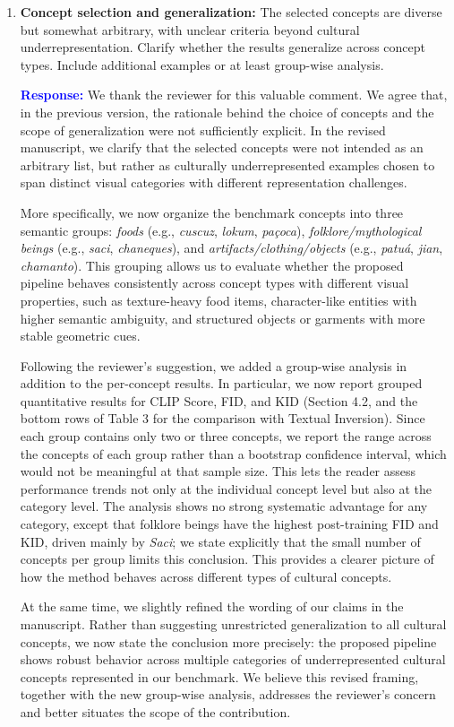\documentclass[11pt]{article}
\begin{document}
\begin{enumerate}[label=\textbf{C\arabic*.}, leftmargin=*]
\item \textbf{Concept selection and generalization:} The selected concepts are diverse but somewhat arbitrary, with unclear criteria beyond cultural underrepresentation. Clarify whether the results generalize across concept types. Include additional examples or at least group-wise analysis.

\textbf{\textcolor{blue}{Response:}} We thank the reviewer for this valuable comment. We agree that, in the previous version, the rationale behind the choice of concepts and the scope of generalization were not sufficiently explicit. In the revised manuscript, we clarify that the selected concepts were not intended as an arbitrary list, but rather as culturally underrepresented examples chosen to span distinct visual categories with different representation challenges.

More specifically, we now organize the benchmark concepts into three semantic groups: \emph{foods} (e.g., \textit{cuscuz}, \textit{lokum}, \textit{pa\c{c}oca}), \emph{folklore/mythological beings} (e.g., \textit{saci}, \textit{chaneques}), and \emph{artifacts/clothing/objects} (e.g., \textit{patu\'a}, \textit{jian}, \textit{chamanto}). This grouping allows us to evaluate whether the proposed pipeline behaves consistently across concept types with different visual properties, such as texture-heavy food items, character-like entities with higher semantic ambiguity, and structured objects or garments with more stable geometric cues.

Following the reviewer’s suggestion, we added a group-wise analysis in addition to the per-concept results. In particular, we now report grouped quantitative results for CLIP Score, FID, and KID (Section 4.2, and the bottom rows of Table 3 for the comparison with Textual Inversion). Since each group contains only two or three concepts, we report the range across the concepts of each group rather than a bootstrap confidence interval, which would not be meaningful at that sample size. This lets the reader assess performance trends not only at the individual concept level but also at the category level. The analysis shows no strong systematic advantage for any category, except that folklore beings have the highest post-training FID and KID, driven mainly by \textit{Saci}; we state explicitly that the small number of concepts per group limits this conclusion. This provides a clearer picture of how the method behaves across different types of cultural concepts.

At the same time, we slightly refined the wording of our claims in the manuscript. Rather than suggesting unrestricted generalization to all cultural concepts, we now state the conclusion more precisely: the proposed pipeline shows robust behavior across multiple categories of underrepresented cultural concepts represented in our benchmark. We believe this revised framing, together with the new group-wise analysis, addresses the reviewer’s concern and better situates the scope of the contribution.
\end{enumerate}
\end{document}
